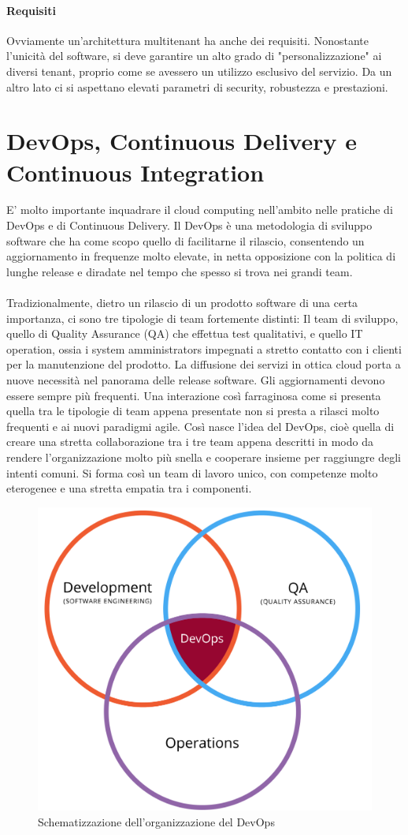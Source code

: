 \paragraph{Requisiti}
Ovviamente un'architettura multitenant ha anche dei requisiti. Nonostante l'unicità del software, si deve garantire un alto grado di "personalizzazione" ai diversi tenant, proprio come se avessero un utilizzo esclusivo del servizio. Da un altro lato ci si aspettano elevati parametri di security, robustezza e prestazioni.

\section{DevOps, Continuous Delivery e Continuous Integration}
E' molto importante inquadrare il cloud computing nell'ambito nelle pratiche di DevOps e di Continuous Delivery.  Il DevOps è una metodologia di sviluppo software che ha come scopo quello di facilitarne il rilascio, consentendo un aggiornamento in frequenze molto elevate, in netta opposizione con la politica di lunghe release e diradate nel tempo che spesso si trova nei grandi team. 
\paragraph{}
Tradizionalmente, dietro un rilascio di un prodotto software di una certa importanza, ci sono tre tipologie di team fortemente distinti: Il team di sviluppo, quello di Quality Assurance (QA) che effettua test qualitativi, e quello IT operation, ossia i system amministrators impegnati a stretto contatto con i clienti per la manutenzione del prodotto. La diffusione dei servizi in ottica cloud porta a nuove necessità nel panorama delle release software. Gli aggiornamenti devono essere sempre più frequenti. Una interazione così farraginosa come si presenta quella tra le tipologie di team appena presentate non si presta a rilasci molto frequenti e ai nuovi paradigmi agile. Così nasce l'idea del DevOps, cioè quella di creare una stretta collaborazione tra i tre team appena descritti in modo da rendere l'organizzazione molto più snella e cooperare insieme per raggiungre degli intenti comuni. Si forma così un team di lavoro unico, con competenze molto eterogenee e una stretta empatia tra i componenti.
\begin{figure}[h]
	\centering
	\includegraphics[width=0.5\linewidth]{capitoli/imgs/Devops.png}
	\caption{Schematizzazione dell'organizzazione del DevOps}
	\label{fig:devops}
\end{figure}

